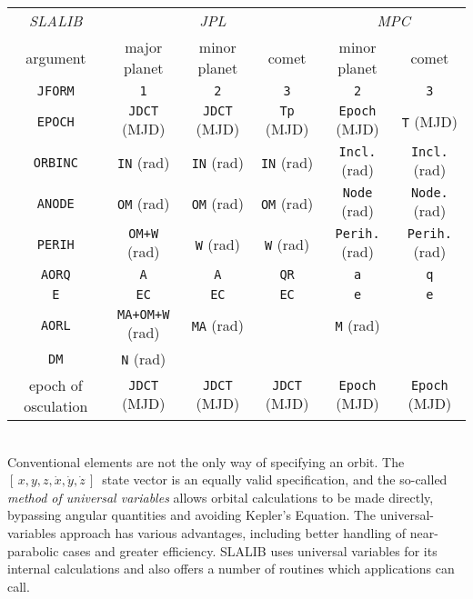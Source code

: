 \documentclass[11pt,twoside]{article}
\newcommand{\xyzxyzd}   {$[\,x,y,z,\dot{x},\dot{y},\dot{z}\,]$}
\begin{document}
\begin{small}
\begin{tabular}{|c||c|c|c||c|c|} \hline
{\it SLALIB } & \multicolumn{3}{c||}{\it JPL}
 & \multicolumn{2}{c|}{\it MPC} \\
argument & major planet & minor planet & comet & minor planet & comet \\
\hline \hline
{\tt JFORM} & {\tt 1} & {\tt 2} & {\tt 3} & {\tt 2} & {\tt 3} \\
{\tt EPOCH} & {\tt JDCT} (MJD) & {\tt JDCT} (MJD) & {\tt Tp} (MJD) &
                                    {\tt Epoch} (MJD) & {\tt T} (MJD) \\
{\tt ORBINC} & {\tt IN} (rad) & {\tt IN} (rad) & {\tt IN} (rad) &
                                {\tt Incl.} (rad) & {\tt Incl.} (rad) \\
{\tt ANODE} & {\tt OM} (rad) & {\tt OM} (rad) & {\tt OM} (rad) &
                                 {\tt Node} (rad) & {\tt Node.} (rad) \\
{\tt PERIH} & {\tt OM+W} (rad) & {\tt W} (rad) & {\tt W} (rad) &
                              {\tt Perih.} (rad) & {\tt Perih.} (rad) \\
{\tt AORQ} & {\tt A} & {\tt A} & {\tt QR} & {\tt a} & {\tt q} \\
{\tt E} & {\tt EC} & {\tt EC} & {\tt EC} & {\tt e} & {\tt e} \\
{\tt AORL} & {\tt MA+OM+W} (rad) & {\tt MA} (rad) & & {\tt M} (rad) & \\
{\tt DM} & {\tt N} (rad) & & & & \\  \hline
epoch of osculation & {\tt JDCT} (MJD)
                    & {\tt JDCT} (MJD)
                    & {\tt JDCT} (MJD)
                    & {\tt Epoch} (MJD)
                    & {\tt Epoch} (MJD) \\
\hline
\end{tabular}
\end{small}\\[3ex]

Conventional elements are not the only way of specifying an orbit.
The \xyzxyzd\ state vector is an equally valid specification,
and the so-called {\it method of universal variables}\/ allows
orbital calculations to be made directly, bypassing angular
quantities and avoiding Kepler's Equation.  The universal-variables
approach has various advantages, including better handling of
near-parabolic cases and greater efficiency.
SLALIB uses universal variables for its internal
calculations and also offers a number of routines which
applications can call.
\end{document}
